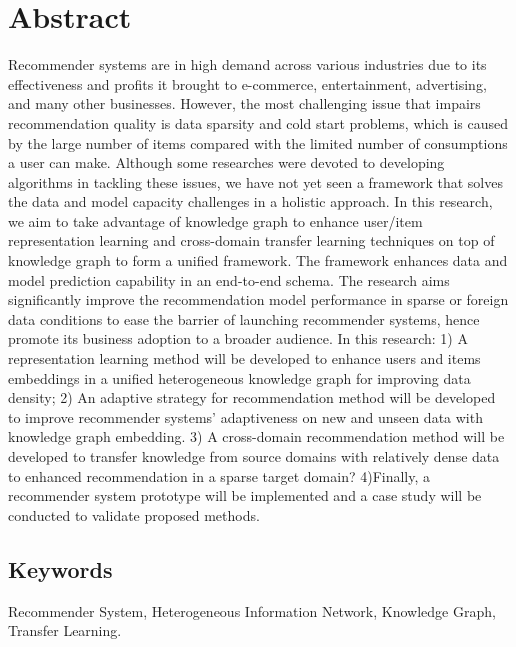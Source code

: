 \section*{Abstract}
Recommender systems are in high demand across various industries due to its effectiveness and profits it brought to e-commerce, entertainment, advertising, and many other businesses. However, the most challenging issue that impairs recommendation quality is data sparsity and cold start problems, which is caused by the large number of items compared with the limited number of  consumptions a user can make. Although some researches were devoted to developing algorithms in tackling these issues, we have not yet seen a framework that solves the data and model capacity challenges in a holistic approach. In this research, we aim to take advantage of knowledge graph to enhance user/item representation learning and cross-domain transfer learning techniques on top of knowledge graph to form a unified framework. The framework enhances data and model prediction capability in an end-to-end schema. The research aims significantly improve the recommendation model performance in sparse or foreign data conditions to ease the barrier of launching recommender systems, hence promote its business adoption to a broader audience. In this research: 1) A representation learning method will be developed to enhance users and items embeddings in a unified heterogeneous knowledge graph for improving data density; 2) An adaptive strategy for recommendation method will be developed to improve recommender systems’ adaptiveness on new and unseen data with knowledge graph embedding. 3) A cross-domain recommendation method will be developed to transfer knowledge from source domains with relatively dense data to  enhanced recommendation in a sparse target domain? 4)Finally, a recommender system prototype will be implemented and a case study will be conducted to validate proposed methods. 

\subsection*{Keywords} 
Recommender System, Heterogeneous Information Network, Knowledge Graph, Transfer Learning.